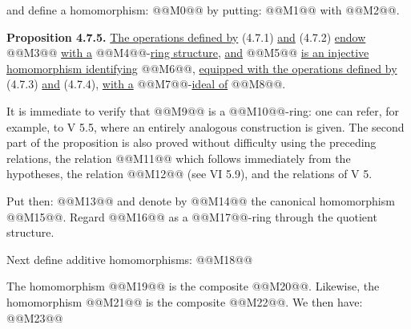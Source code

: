and define a homomorphism:
@@M0@@
by putting:
@@M1@@
with @@M2@@.

\textbf{Proposition 4.7.5.} \uline{The operations defined by} (4.7.1) \uline{and} (4.7.2) \uline{endow} @@M3@@ \uline{with a} @@M4@@-\uline{ring structure}, \uline{and} @@M5@@ \uline{is an injective homomorphism identifying} @@M6@@, \uline{equipped with the operations defined by} (4.7.3) \uline{and} (4.7.4), \uline{with a} @@M7@@-\uline{ideal of} @@M8@@.

It is immediate to verify that @@M9@@ is a @@M10@@-ring: one can refer, for example, to V 5.5, where an entirely analogous construction is given. The second part of the proposition is also proved without difficulty using the preceding relations, the relation @@M11@@ which follows immediately from the hypotheses, the relation @@M12@@ (see VI 5.9), and the relations of V 5.

Put then:
@@M13@@
and denote by @@M14@@ the canonical homomorphism @@M15@@. Regard @@M16@@ as a @@M17@@-ring through the quotient structure.

Next define additive homomorphisms:
@@M18@@

The homomorphism @@M19@@ is the composite @@M20@@. Likewise, the homomorphism @@M21@@ is the composite @@M22@@. We then have:
@@M23@@
